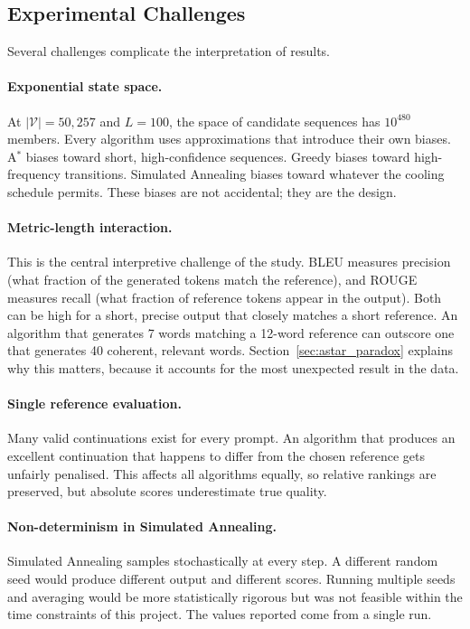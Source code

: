 \documentclass[12pt]{article}
\begin{document}
	\subsection{Experimental Challenges}
	
	Several challenges complicate the interpretation of results.
	
	\paragraph{Exponential state space.}
	At $|\mathcal{V}| = 50{,}257$ and $L = 100$, the space of candidate sequences has $10^{480}$ members. Every algorithm uses approximations that introduce their own biases. A$^*$ biases toward short, high-confidence sequences. Greedy biases toward high-frequency transitions. Simulated Annealing biases toward whatever the cooling schedule permits. These biases are not accidental; they are the design.
	
	\paragraph{Metric-length interaction.}
	This is the central interpretive challenge of the study. BLEU measures precision (what fraction of the generated tokens match the reference), and ROUGE measures recall (what fraction of reference tokens appear in the output). Both can be high for a short, precise output that closely matches a short reference. An algorithm that generates 7 words matching a 12-word reference can outscore one that generates 40 coherent, relevant words. Section~\ref{sec:astar_paradox} explains why this matters, because it accounts for the most unexpected result in the data.
	
	\paragraph{Single reference evaluation.}
	Many valid continuations exist for every prompt. An algorithm that produces an excellent continuation that happens to differ from the chosen reference gets unfairly penalised. This affects all algorithms equally, so relative rankings are preserved, but absolute scores underestimate true quality.
	
	\paragraph{Non-determinism in Simulated Annealing.}
	Simulated Annealing samples stochastically at every step. A different random seed would produce different output and different scores. Running multiple seeds and averaging would be more statistically rigorous but was not feasible within the time constraints of this project. The values reported come from a single run.
	
\end{document}
